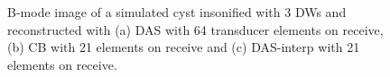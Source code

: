 \documentclass[conference]{IEEEtran}
\begin{document}
\begin{figure}[htb]
	\hfill%
	\hfill%
	\hfill%
	\hfill%
	\caption{B-mode image of a simulated cyst insonified with 3 DWs and reconstructed with (a) DAS with 64 transducer elements on receive, (b) CB with 21 elements on receive and (c) DAS-interp with 21 elements on receive.}
	\label{fig_DW}
\end{figure}
\end{document}
